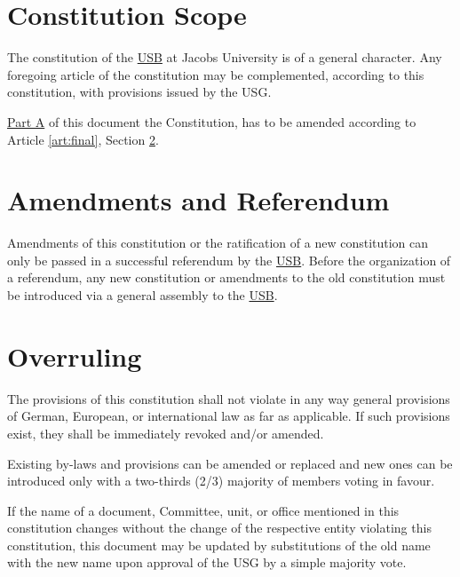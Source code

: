 \label{art:final}

\section{Constitution Scope}
The constitution of the \hyperref[studentbody]{USB} at Jacobs University is of a general character. Any foregoing article of the constitution may be complemented, according to this constitution, with provisions issued by the USG.
\begin{parenum}
\item \hyperref[PartA]{Part A} of this document  the Constitution,  has to be amended according to Article \protect\ref{art:final}, Section \protect\ref{Ammendments}.
\item {}
\item {}
\end{parenum}

\section{Amendments and Referendum}
\label{Ammendments}
Amendments of this constitution or the ratification of a new constitution can only be passed in a successful referendum by the \hyperref[studentbody]{USB}. Before the organization of a referendum, any new constitution or amendments to the old constitution must be introduced via a general assembly to the \hyperref[studentbody]{USB}. 

\section{Overruling} 
The provisions of this constitution shall not violate in any way general provisions of German, European, or international law as far as applicable. If such provisions exist, they shall be immediately revoked and/or amended.

\label{sec:internal-changes}
\begin{parenum}
\item Existing by-laws and provisions can be amended or replaced and new ones can be introduced only with a two-thirds (2/3) majority of members voting in favour.
\item If the name of a document, Committee, unit, or office mentioned in this constitution changes without the change of the respective entity violating this constitution, this document may be updated by substitutions of the old name with the new name upon approval of the USG by a simple majority vote.
\end{parenum}

